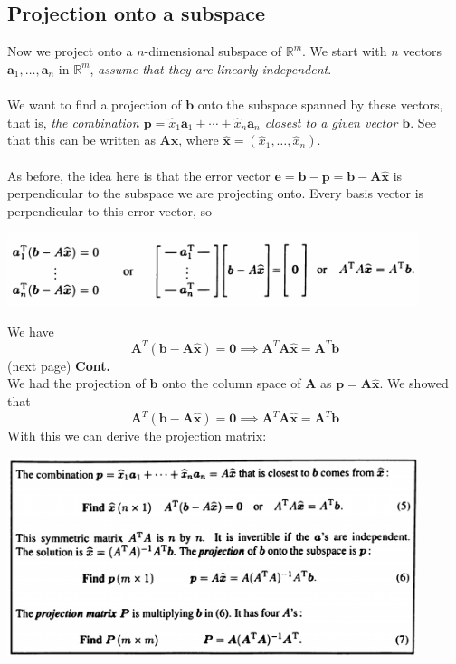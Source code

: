 \documentclass{report}
\begin{document}
\subsection{Projection onto a subspace}
Now we project onto a $n$-dimensional subspace of $\mathbb{R}^m$. We start with $n$ vectors $\bm a_1,\ldots,\bm a_n$ in $\mathbb{R}^m$, 
\textit{assume that they are linearly independent}.\\
\vspace{1mm}\\
We want to find a projection of $\bm b$ onto the subspace spanned by these vectors, that is, 
\textit{the combination $\bm p=\hat{x}_1\bm a_1+\cdots+\hat{x}_n\bm a_n$ closest to a given vector $\bm b$}. See that this can be written as $\bm A\hat{\bm x}$, where
$\hat{\bm x}=(\hat{x}_1,\ldots,\hat{x}_n)$.\\
\vspace{1mm}\\
As before, the idea here is that the error vector $\bm e=\bm b-\bm p=\bm b-\bm A\hat{\bm x}$ is perpendicular to the subspace we are projecting onto. Every basis vector is
perpendicular to this error vector, so
\begin{center}
\includegraphics[width=12cm]{58}
\end{center}
We have
\begin{equation*}
\bm A^T(\bm b-\bm A\hat{\bm x})=\bm 0\implies \bm A^T\bm A\hat{\bm x}=\bm A^T\bm b
\end{equation*}
(next page)\newpage
\noindent\textbf{Cont.}\\
We had the projection of $\bm b$ onto the column space of $\bm A$ as $\bm p=\bm A\hat{\bm x}$. We showed that 
\begin{equation*}
\bm A^T(\bm b-\bm A\hat{\bm x})=\bm 0\implies \bm A^T\bm A\hat{\bm x}=\bm A^T\bm b
\end{equation*}
With this we can derive the projection matrix:
\begin{center}
\includegraphics[width=12cm]{59}
\end{center}
\end{document}

